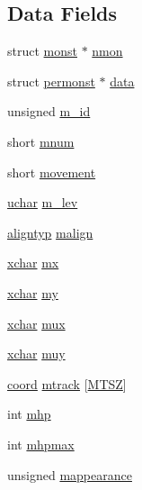 \subsection*{Data Fields}
\begin{DoxyCompactItemize}
\item 
struct \hyperlink{structmonst}{monst} $\ast$ \hyperlink{structmonst_a4c4bcdcf3c4ec4a85313ade9f9c27b72}{nmon}
\item 
struct \hyperlink{structpermonst}{permonst} $\ast$ \hyperlink{structmonst_a5c8369d63f2ae0ca4466258542edecbe}{data}
\item 
unsigned \hyperlink{structmonst_ad8084d1c794f3903b9ffa85fca798abd}{m\+\_\+id}
\item 
short \hyperlink{structmonst_a1a7aab6d8ab6271ccb21d34806c73f47}{mnum}
\item 
short \hyperlink{structmonst_afe3b99a25f844e6fdfc0562e2c854023}{movement}
\item 
\hyperlink{config_8h_a65f85814a8290f9797005d3b28e7e5fc}{uchar} \hyperlink{structmonst_a80ec1118166ea76d347e47d088bd1f7c}{m\+\_\+lev}
\item 
\hyperlink{align_8h_a3e17b7a656899892e425fc89481aa2ab}{aligntyp} \hyperlink{structmonst_a6caf08620c3b04c6ed50de20bb81e198}{malign}
\item 
\hyperlink{global_8h_a2043b7d01ce89f4ee2fa6c345a752d32}{xchar} \hyperlink{structmonst_a9bc20171e986845daccff8aafd8b5194}{mx}
\item 
\hyperlink{global_8h_a2043b7d01ce89f4ee2fa6c345a752d32}{xchar} \hyperlink{structmonst_a0b969d9b6af5b55393f6acfe508c6f08}{my}
\item 
\hyperlink{global_8h_a2043b7d01ce89f4ee2fa6c345a752d32}{xchar} \hyperlink{structmonst_abbf7f123305ee87bce6247f2a168b63d}{mux}
\item 
\hyperlink{global_8h_a2043b7d01ce89f4ee2fa6c345a752d32}{xchar} \hyperlink{structmonst_ab4c41d111e70e2301aebf3c12b1404e8}{muy}
\item 
\hyperlink{structcoord}{coord} \hyperlink{structmonst_a14caf00964c088317063abe32aed9eff}{mtrack} \mbox{[}\hyperlink{monst_8h_a0609ca6cf72228f1fa38c62a21d8b69d}{M\+T\+S\+Z}\mbox{]}
\item 
int \hyperlink{structmonst_abe22e95755f1348a6a1c78252be5d76d}{mhp}
\item 
int \hyperlink{structmonst_a66c107319bb7bb318c04e6a0f5f03c60}{mhpmax}
\item 
unsigned \hyperlink{structmonst_a60ba74caeb4e779b7ccdb99150823bb9}{mappearance}
\item 

\end{DoxyCompactItemize}
